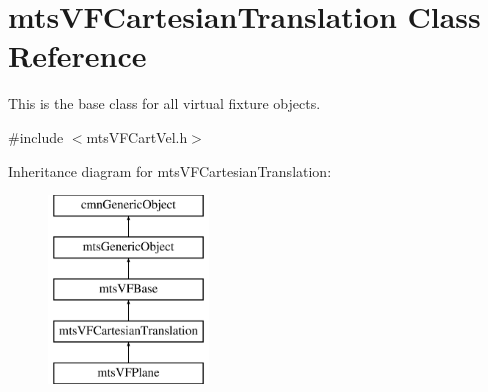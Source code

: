 \hypertarget{classmts_v_f_cartesian_translation}{}\section{mts\+V\+F\+Cartesian\+Translation Class Reference}
\label{classmts_v_f_cartesian_translation}


This is the base class for all virtual fixture objects.  




{\ttfamily \#include $<$mts\+V\+F\+Cart\+Vel.\+h$>$}

Inheritance diagram for mts\+V\+F\+Cartesian\+Translation\+:\begin{figure}[H]
\begin{center}
\leavevmode
\includegraphics[height=5.000000cm]{d7/d59/classmts_v_f_cartesian_translation}
\end{center}
\end{figure}

